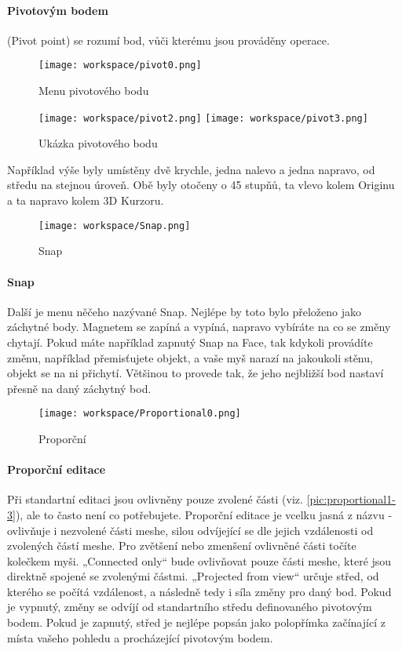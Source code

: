 \documentclass[12pt,a4paper]{report}
\begin{document}
	\paragraph{Pivotovým bodem} (Pivot point) se rozumí bod, vůči kterému jsou
	prováděny operace.
	
	\begin{figure}[h]
		\centering
		\texttt{[image: workspace/pivot0.png]}
		\caption{Menu pivotového bodu}
		\label{pic:pivot0}
	\end{figure}
	\begin{figure}[h]
		\centering
		\texttt{[image: workspace/pivot2.png]}
		\texttt{[image: workspace/pivot3.png]}
		\caption{Ukázka pivotového bodu}
		\label{pic:pivot2-3}
	\end{figure}

	Například výše byly umístěny dvě krychle, jedna nalevo a jedna napravo,
	od středu na stejnou úroveň. Obě byly otočeny o 45 stupňů, ta vlevo kolem
	Originu a ta napravo kolem 3D Kurzoru.
	
	\begin{figure}[h]
		\centering
		\texttt{[image: workspace/Snap.png]}
		\caption{Snap}
		\label{pic:snap}
	\end{figure}
	
	\paragraph{Snap} Další je menu něčeho nazývané Snap. Nejlépe by toto bylo
	přeloženo jako záchytné body. Magnetem se zapíná a vypíná, napravo
	vybíráte na co se změny chytají. Pokud máte například zapnutý Snap na
	Face, tak kdykoli provádíte změnu, například přemisťujete objekt, a vaše
	myš narazí na jakoukoli stěnu, objekt se na ni přichytí. Většinou to
	provede tak, že jeho nejbližší bod nastaví přesně na daný záchytný bod.
	
	\begin{figure}[h]
		\centering
		\texttt{[image: workspace/Proportional0.png]}
		\caption{Proporční}
		\label{pic:proportional0}
	\end{figure}

	\paragraph{Proporční editace} Při standartní editaci jsou ovlivněny pouze zvolené
	části (viz. \ref{pic:proportional1-3}), ale to často není co potřebujete. Proporční
	editace je vcelku jasná z názvu - ovlivňuje i nezvolené části meshe, silou
	odvíjející se dle jejich vzdálenosti od zvolených částí meshe. Pro zvětšení
	nebo zmenšení ovlivněné části točíte kolečkem myši. „Connected only“
	bude ovlivňovat pouze části meshe, které jsou direktně spojené se
	zvolenými částmi. „Projected from view“ určuje střed, od kterého se
	počítá vzdálenost, a následně tedy i síla změny pro daný bod. Pokud je
	vypnutý, změny se odvíjí od standartního středu definovaného pivotovým
	bodem. Pokud je zapnutý, střed je nejlépe popsán jako polopřímka
	začínající z místa vašeho pohledu a procházející pivotovým bodem.
	
\end{document}
